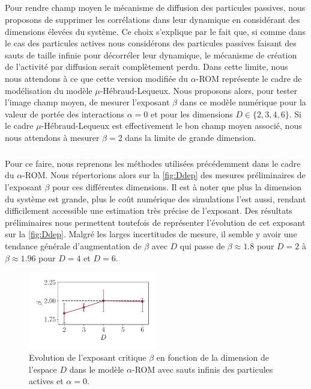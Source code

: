 \subparagraph{}Pour rendre champ moyen le mécanisme de diffusion des particules passives, nous proposons de supprimer les corrélations dans leur dynamique en considérant des dimensions élevées du système. Ce choix s'explique par le fait que, si comme dans le cas des particules actives nous considérons des particules passives faisant des sauts de taille infinie pour décorréler leur dynamique, le mécanisme de création de l'activité par diffusion serait complètement perdu. Dans cette limite, nous nous attendons à ce que cette version modifiée du $\alpha$-ROM représente le cadre de modélisation du modèle $\mu$-Hébraud-Lequeux. Nous proposons alors, pour tester l'image champ moyen, de mesurer l'exposant $\beta$ dans ce modèle numérique pour la valeur de portée des interactions $\alpha = 0$ et pour les dimensions $D\in\{2,3,4,6\}$. Si le cadre $\mu$-Hébraud-Lequeux est effectivement le bon champ moyen associé, nous nous attendons à mesurer $\beta = 2$ dans la limite de grande dimension.

\subparagraph{}Pour ce faire, nous reprenons les méthodes utilisées précédemment dans le cadre du $\alpha$-ROM. Nous répertorions alors sur la \autoref{fig:Ddep} des mesures préliminaires de l'exposant $\beta$ pour ces différentes dimensions. Il est à noter que plus la dimension du système est grande, plus le coût numérique des simulations l'est aussi, rendant difficilement accessible une estimation très précise de l'exposant. Des résultats préliminaires nous permettent toutefois de représenter l'évolution de cet exposant sur la \autoref{fig:Ddep}. Malgré les larges incertitudes de mesure, il semble y avoir une tendance générale d'augmentation de $\beta$ avec $D$ qui passe de $\beta \approx 1.8$ pour $D=2$ à $\beta \approx 1.96$ pour $D=4$ et $D=6$.

\begin{figure}[h]
	\centering
	\includegraphics[width=0.5\textwidth]{Chapitre3/Figures/Interpretation/D_dependence.pdf}
	\caption{Evolution de l'exposant critique $\beta$ en fonction de la dimension de l'espace $D$ dans le modèle $\alpha$-ROM avec sauts infinis des particules actives et $\alpha = 0$.}
	\label{fig:Ddep}
\end{figure}

